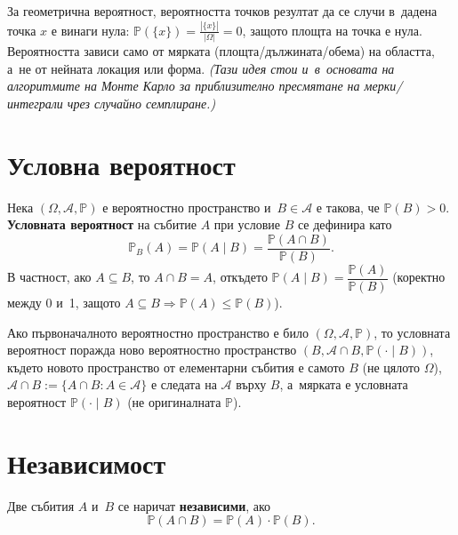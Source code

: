 \begin{rembox}[Важно]
За геометрична вероятност, вероятността точков резултат да се случи
в~дадена точка $x$ е винаги нула:
$\mathbb{P}(\{x\}) = \tfrac{|\{x\}|}{|\Omega|} = 0$,
защото площта на точка е нула. Вероятността зависи само от мярката
(площта/дължината/обема) на областта, а~не от нейната локация или
форма. \emph{(Тази идея стои и~в~основата на алгоритмите на Монте
Карло за приблизително пресмятане на мерки/интеграли чрез случайно
семплиране.)}
\end{rembox}

\section{Условна вероятност}

\begin{defbox}
Нека $(\Omega,\mathcal{A},\mathbb{P})$ е вероятностно пространство и~$B\in\mathcal{A}$ е такова, че $\mathbb{P}(B)>0$. \textbf{Условната
вероятност} на събитие $A$ при условие $B$ се дефинира като
\[
  \mathbb{P}_B(A) = \mathbb{P}(A\mid B) = \frac{\mathbb{P}(A\cap B)}{\mathbb{P}(B)}.
\]
В частност, ако $A\subseteq B$, то $A\cap B=A$, откъдето
$\mathbb{P}(A\mid B) = \dfrac{\mathbb{P}(A)}{\mathbb{P}(B)}$ (коректно
между 0 и~1, защото $A\subseteq B\Rightarrow\mathbb P(A)\le\mathbb
P(B)$).
\end{defbox}

\begin{rembox}[Забележка]
Ако първоначалното вероятностно пространство е било
$(\Omega,\mathcal{A},\mathbb{P})$, то условната вероятност поражда
ново вероятностно пространство $(B,\mathcal{A}\cap B,\mathbb{P}(\cdot
\mid B))$, където новото пространство от елементарни събития е самото
$B$ (не цялото $\Omega$), $\mathcal A\cap B:=\{A\cap B:A\in\mathcal
A\}$ е следата на $\mathcal A$ върху $B$, а~мярката е условната
вероятност $\mathbb P(\cdot\mid B)$ (не оригиналната $\mathbb P$).
\end{rembox}

\section{Независимост}

\begin{defbox}
Две събития $A$ и~$B$ се наричат \textbf{независими}, ако
\[
  \mathbb{P}(A\cap B) = \mathbb{P}(A)\cdot\mathbb{P}(B).
\]
\end{defbox}


